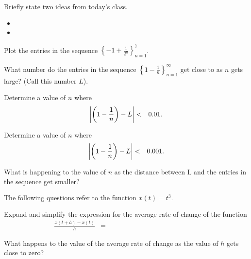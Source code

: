 \begin{problem}
\item Briefly state two ideas from today's class.
  \begin{itemize}
  \item
  \item
  \end{itemize}
    \item Plot the entries in the sequence $\left\{ -1+\frac{1}{2^n}\right\}_{n=1}^7$.

      \scalebox{0.7}{}

      \begin{subproblem}

      \item What number do the entries in the sequence
        $\left\{ 1-\frac{1}{n}\right\}_{n=1}^\infty$ get close to as $n$
        gets large?  (Call this number $L$).

      \item Determine a value of $n$ where
        \begin{eqnarray*}
          \left| \left( 1-\frac{1}{n} \right) - L \right| & < & 0.01.
        \end{eqnarray*}

        \vfill

      \item Determine a value of $n$ where
        \begin{eqnarray*}
          \left| \left( 1-\frac{1}{n}\right) - L \right| & < & 0.001.
        \end{eqnarray*}

        \vfill

      \item What is happening to the value of $n$ as the distance
        between L and the entries in the sequence get smaller?

        \vspace{3em}

      \end{subproblem}


  \clearpage
  \item The following questions refer to the function $x(t)=t^3$.
    \begin{subproblem}
    \item Expand and simplify the expression for the average rate of
      change of the function
      \begin{eqnarray*}
        \frac{x(t+h)-x(t)}{h} & = & ~~~~~~~~~~~~~~~~~~~~~~~~~~~~~~~~~~~~~~~~~~~~~~~~~~~~~~~~~~
      \end{eqnarray*}
      \vspace{3em}
    \item What happens to the value of the average rate of change as
      the value of $h$ gets close to zero?
      \vspace{3em}
    \end{subproblem}


\end{problem}
